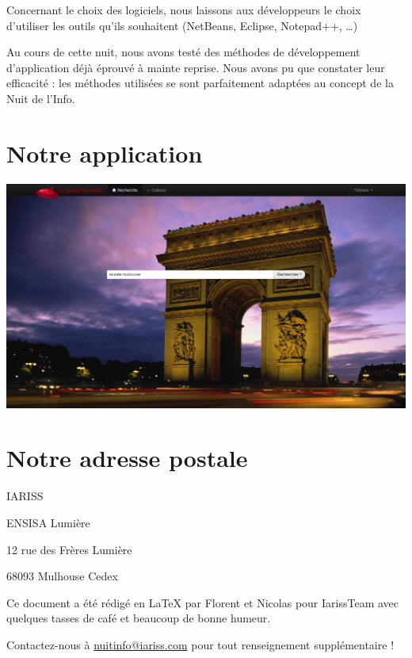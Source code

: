 \documentclass[12pt, a4paper]{article}
\newcommand{\espace}{\vspace{.8cm}}
\newcommand{\authors}{Florent et Nicolas}
\begin{document}
Concernant le choix des logiciels, nous laissons aux développeurs le choix d'utiliser les outils qu'ils souhaitent (NetBeans, Eclipse, Notepad++, \ldots{})

Au cours de cette nuit, nous avons testé des méthodes de développement d'application déjà éprouvé à mainte reprise. Nous avons pu que constater leur efficacité : les méthodes utilisées se sont parfaitement adaptées au concept de la Nuit de l'Info.

\espace{}
\section*{Notre application}


\espace{}
\begin{center}
\includegraphics[width=.9\textwidth, keepaspectratio=true]{img/abase1.png}
\end{center}

\espace{}
\section*{Notre adresse postale}
	
IARISS


ENSISA Lumière

12 rue des Frères Lumière

68093 Mulhouse Cedex


\espace\vfill{}
Ce document a été rédigé en \LaTeX{} par \authors{} pour IarissTeam avec quelques tasses de café et beaucoup de bonne humeur.

Contactez-nous à \href{mailto:nuitinfo@iariss.com}{nuitinfo@iariss.com} pour tout renseignement supplémentaire !
\end{document}
